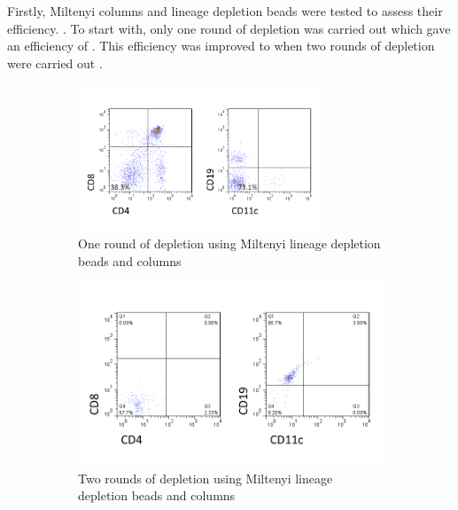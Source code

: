Firstly, Miltenyi columns and lineage depletion beads were tested to assess their efficiency. 
.
To start with, only one round of depletion was carried out which gave an efficiency of .
This efficiency was improved to  when two rounds of depletion were carried out . 
\begin{figure}
	\begin{subfigure}{\textwidth}
	\includegraphics[width=0.8\textwidth]{Figures/1rounddepletion.png}
	\caption{One round of depletion using Miltenyi lineage depletion beads and columns}
	\end{subfigure}
	\hfill
	\begin{subfigure}{0.8\textwidth}
	\includegraphics[width=\textwidth]{Figures/2rounddepletion.png}
	\caption{Two rounds of depletion using Miltenyi lineage depletion beads and columns}
	\label{subfig:2miltenyi}
	\end{subfigure}
	\hfill
	\begin{subfigure}{0.8\textwidth}

\end{subfigure}
\end{figure}
